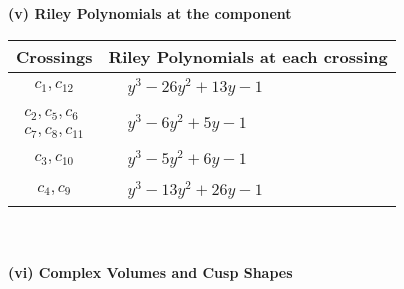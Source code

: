\documentclass[1p]{elsarticle_modified}
\theoremstyle{definition}
\begin{document}
\newpage\renewcommand{\arraystretch}{1}
\flushleft \textbf{(v) Riley Polynomials at the component}\newline \\
\begin{tabular}{m{50pt}|m{274pt}}
Crossings & \hspace{64pt}Riley Polynomials at each crossing \\
\hline $$\begin{aligned}c_{1},c_{12}\end{aligned}$$&$\begin{aligned}
&y^3-26 y^2+13 y-1
\end{aligned}$\\
\hline $$\begin{aligned}c_{2},c_{5},c_{6}\\c_{7},c_{8},c_{11}\end{aligned}$$&$\begin{aligned}
&y^3-6 y^2+5 y-1
\end{aligned}$\\
\hline $$\begin{aligned}c_{3},c_{10}\end{aligned}$$&$\begin{aligned}
&y^3-5 y^2+6 y-1
\end{aligned}$\\
\hline $$\begin{aligned}c_{4},c_{9}\end{aligned}$$&$\begin{aligned}
&y^3-13 y^2+26 y-1
\end{aligned}$\\
\hline
\end{tabular}\\~\\
\newpage\flushleft \textbf{(vi) Complex Volumes and Cusp Shapes}
\end{document}
